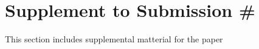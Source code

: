 
\section*{Supplement to Submission \#}

This section includes supplemental matterial for the paper
